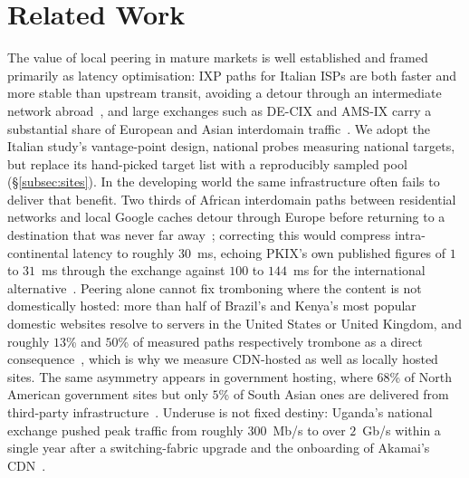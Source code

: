 \documentclass[sigconf,anonymous,10pt]{acmart}
\begin{document}
\section{Related Work}
\label{sec:related-work}
The value of local peering in mature markets is well established and framed primarily as latency optimisation: IXP paths for Italian ISPs are both faster and more stable than upstream transit, avoiding a detour through an intermediate network abroad~\cite{dibartolomeo2015}, and large exchanges such as DE-CIX and AMS-IX carry a substantial share of European and Asian interdomain traffic~\cite{ager2012, chatzis2013}. We adopt the Italian study's vantage-point design, national probes measuring national targets, but replace its hand-picked target list with a reproducibly sampled pool (\S\ref{subsec:sites}). In the developing world the same infrastructure often fails to deliver that benefit. Two thirds of African interdomain paths between residential networks and local Google caches detour through Europe before returning to a destination that was never far away~\cite{gupta2014}; correcting this would compress intra-continental latency to roughly 30~ms, echoing PKIX's own published figures of $1$ to $31$~ms through the exchange against $100$ to $144$~ms for the international alternative~\cite{pta2026}. Peering alone cannot fix tromboning where the content is not domestically hosted: more than half of Brazil's and Kenya's most popular domestic websites resolve to servers in the United States or United Kingdom, and roughly $13$\% and $50$\% of measured paths respectively trombone as a direct consequence~\cite{edmundson2016characterizing}, which is why we measure CDN-hosted as well as locally hosted sites. The same asymmetry appears in government hosting, where $68$\% of North American government sites but only $5$\% of South Asian ones are delivered from third-party infrastructure~\cite{kumar2024choices}. Underuse is not fixed destiny: Uganda's national exchange pushed peak traffic from roughly $300$~Mb/s to over $2$~Gb/s within a single year after a switching-fabric upgrade and the onboarding of Akamai's CDN~\cite{obriain2017rebuilding}.
\end{document}
